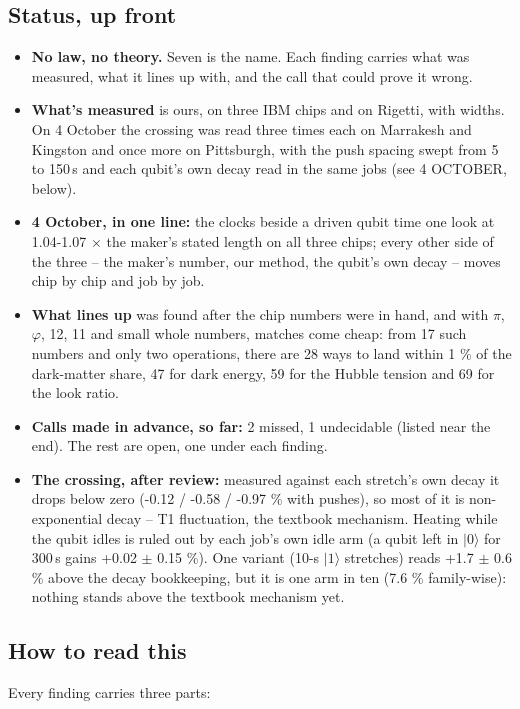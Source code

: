 \documentclass[11pt]{article}
\begin{document}
\subsection*{Status, up front}
\begin{itemize}
\item \textbf{No law, no theory.} Seven is the name. Each finding carries what was measured, what it lines up with, and the call that could prove it wrong.
\item \textbf{What's measured} is ours, on three IBM chips and on Rigetti, with widths. On 4 October the crossing was read three times each on Marrakesh and Kingston and once more on Pittsburgh, with the push spacing swept from 5 to 150\,\textmu s and each qubit's own decay read in the same jobs (see 4 OCTOBER, below).
\item \textbf{4 October, in one line:} the clocks beside a driven qubit time one look at 1.04-1.07 \(\times\) the maker's stated length on all three chips; every other side of the three -- the maker's number, our method, the qubit's own decay -- moves chip by chip and job by job.
\item \textbf{What lines up} was found after the chip numbers were in hand, and with \(\pi\), \(\varphi\), 12, 11 and small whole numbers, matches come cheap: from 17 such numbers and only two operations, there are 28 ways to land within 1 \% of the dark-matter share, 47 for dark energy, 59 for the Hubble tension and 69 for the look ratio.
\item \textbf{Calls made in advance, so far:} 2 missed, 1 undecidable (listed near the end). The rest are open, one under each finding.
\item \textbf{The crossing, after review:} measured against each stretch's own decay it drops below zero (-0.12 / -0.58 / -0.97 \% with pushes), so most of it is non-exponential decay -- T1 fluctuation, the textbook mechanism. Heating while the qubit idles is ruled out by each job's own idle arm (a qubit left in \(|0\rangle\) for 300\,\textmu s gains +0.02 \(\pm\) 0.15 \%). One variant (10-\textmu s \(|1\rangle\) stretches) reads +1.7 \(\pm\) 0.6 \% above the decay bookkeeping, but it is one arm in ten (7.6 \% family-wise): nothing stands above the textbook mechanism yet.
\end{itemize}
\subsection*{How to read this}
Every finding carries three parts:
\end{document}
